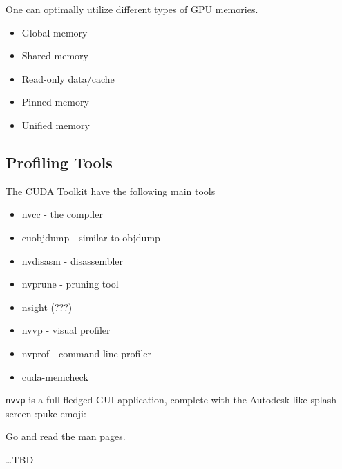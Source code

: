 One can optimally utilize different types of GPU memories.
\begin{itemize}
    \item Global memory
    \item Shared memory
    \item Read-only data/cache
    \item Pinned memory
    \item Unified memory
\end{itemize}

\subsection*{Profiling Tools}
The CUDA Toolkit have the following main tools
\begin{itemize}
    \item nvcc - the compiler
    \item cuobjdump - similar to objdump
    \item nvdisasm - disassembler
    \item nvprune - pruning tool
    \item nsight (???)
    \item nvvp - visual profiler
    \item nvprof - command line profiler
    \item cuda-memcheck
\end{itemize}

\texttt{nvvp} is a full-fledged GUI application, complete with the
Autodesk-like splash screen :puke-emoji:

Go and read the man pages.

\ldots TBD  %



